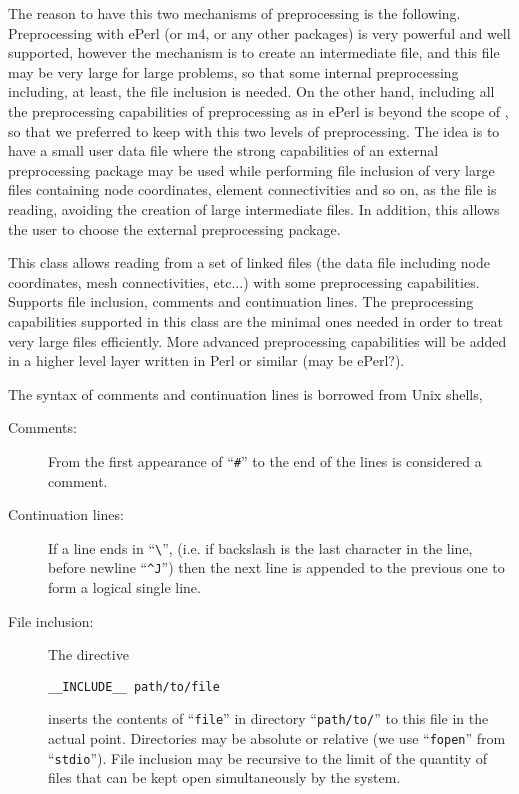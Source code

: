 The reason to have this two mechanisms of preprocessing is the
following. Preprocessing with ePerl (or m4, or any other packages) is
very powerful and well supported, however the mechanism is to create
an intermediate file, and this file may be very large for large
problems, so that some internal preprocessing including, at least, the
file inclusion is needed. On the other hand, including all the
preprocessing capabilities of preprocessing as in ePerl is beyond the
scope of \pfem{}, so that we preferred to keep with this two levels of
preprocessing. The idea is to have a small user data file where the
strong capabilities of an external preprocessing package may be used
while performing file inclusion of very large files containing node
coordinates, element connectivities and so on, as the file is reading,
avoiding the creation of large intermediate files.  In addition, this
allows the user to choose the external preprocessing package.

\label{sec:fstack}  

%
This class allows reading from a set of linked files (the \pfem{}
data file including node coordinates, mesh connectivities, etc...)
with some preprocessing capabilities. Supports file inclusion,
comments and continuation lines. The preprocessing capabilities
supported in this class are the minimal ones needed in order to treat
very large files efficiently. More advanced preprocessing capabilities
will be added in a higher level layer written in Perl or similar (may
be ePerl?).


The syntax of comments and continuation lines is borrowed from Unix
shells,

\begin{description}

\item[Comments:] From the first appearance of ``\verb+#+'' to the end
of the lines is considered a comment. 

\item[Continuation lines:] If a line ends in ``\verb+\+'',
(i.e. if backslash is the last character in the line, before newline
``\verb+^J+'') then the next line is appended to the previous one to
form a logical single line. 

\item [File inclusion: ] The directive 
%
\begin{verbatim}
__INCLUDE__ path/to/file
\end{verbatim}
%
inserts the contents of ``\verb+file+'' in directory
``\verb+path/to/+'' to this file in the actual point. Directories may
be absolute or relative (we use ``\verb+fopen+'' from
``\verb+stdio+''). File inclusion may be recursive to the limit of the
quantity of files that can be kept open simultaneously by the system.
\end{description}


